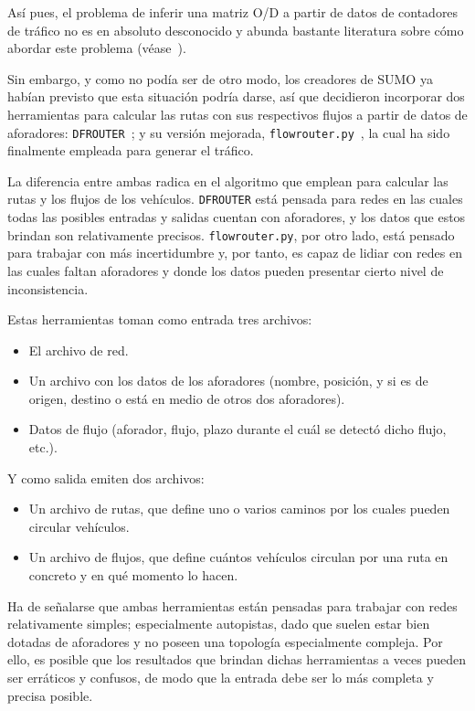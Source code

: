 Así pues, el problema de inferir una matriz O/D a partir de datos de contadores de tráfico no es en absoluto desconocido y abunda bastante literatura sobre cómo abordar este problema (véase~\cite{otto_anker_nielsen_two_1998}). 

Sin embargo, y como no podía ser de otro modo, los creadores de SUMO ya habían previsto que esta situación podría darse, así que decidieron incorporar dos herramientas para calcular las rutas con sus respectivos flujos a partir de datos de aforadores: \texttt{DFROUTER}~\cite{noauthor_dfrouter_nodate}; y su versión mejorada, \texttt{flowrouter.py}~\cite{noauthor_flowrouterpy_nodate,behrisch_route_2018}, la cual ha sido finalmente empleada para generar el tráfico.

La diferencia entre ambas radica en el algoritmo que emplean para calcular las rutas y los flujos de los vehículos. \texttt{DFROUTER} está pensada para redes en las cuales todas las posibles entradas y salidas cuentan con aforadores, y los datos que estos brindan son relativamente precisos. \texttt{flowrouter.py}, por otro lado, está pensado para trabajar con más incertidumbre y, por tanto, es capaz de lidiar con redes en las cuales faltan aforadores y donde los datos pueden presentar cierto nivel de inconsistencia.

Estas herramientas toman como entrada tres archivos:

\begin{itemize}
    \item El archivo de red.
    \item Un archivo con los datos de los aforadores (nombre, posición, y si es de origen, destino o está en medio de otros dos aforadores).
    \item Datos de flujo (aforador, flujo, plazo durante el cuál se detectó dicho flujo, etc.).
\end{itemize}

Y como salida emiten dos archivos:

\begin{itemize}
    \item Un archivo de rutas, que define uno o varios caminos por los cuales pueden circular vehículos.
    \item Un archivo de flujos, que define cuántos vehículos circulan por una ruta en concreto y en qué momento lo hacen.
\end{itemize}

Ha de señalarse que ambas herramientas están pensadas para trabajar con redes relativamente simples; especialmente autopistas, dado que suelen estar bien dotadas de aforadores y no poseen una topología especialmente compleja. Por ello, es posible que los resultados que brindan dichas herramientas a veces pueden ser erráticos y confusos, de modo que la entrada debe ser lo más completa y precisa posible.

